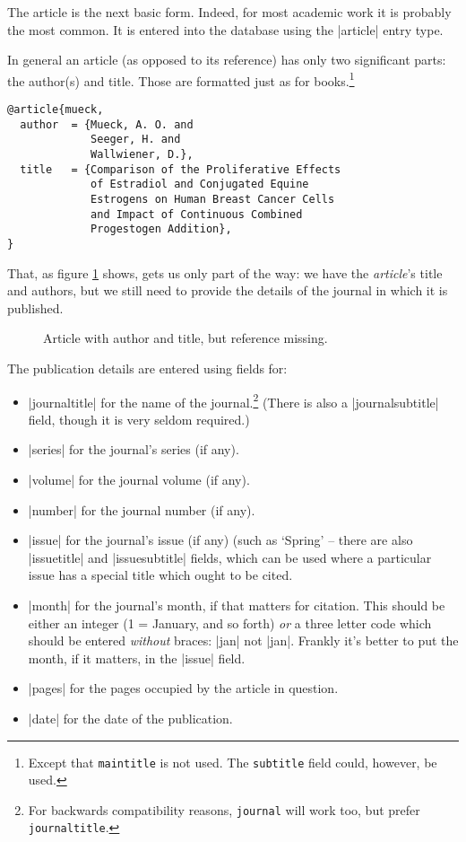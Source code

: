 The article is the next basic form. Indeed, for most academic work it
is probably the most common. It is entered into the database using the
|article| entry type.

In general an article (as opposed to its reference) has only two
significant parts: the author(s) and title. Those are formatted just
as for books.\footnote{Except that \texttt{maintitle} is not used. The
  \texttt{subtitle} field could, however, be used.}
\begin{Verbatim}
@article{mueck,
  author  = {Mueck, A. O. and
             Seeger, H. and
             Wallwiener, D.},
  title   = {Comparison of the Proliferative Effects
             of Estradiol and Conjugated Equine
             Estrogens on Human Breast Cancer Cells
             and Impact of Continuous Combined
             Progestogen Addition},
}
\end{Verbatim}

That, as figure \ref{mueck} shows, gets us only part of the way: we
have the \emph{article}'s title and authors, but we still need to
provide the details of the journal in which it is published.

\begin{figure}
\caption{Article with author and title, but reference missing.\label{mueck}}
\end{figure}

The publication details are entered using fields for:
\begin{itemize}
\item |journaltitle| for the name of the journal.\footnote{For
    backwards compatibility reasons, \texttt{journal} will work too,
    but prefer \texttt{journaltitle}.} (There is also a
  |journalsubtitle| field, though it is very seldom required.)
\item |series| for the journal's series (if any).
\item |volume| for the journal volume (if any).
\item |number| for the journal number (if any).
\item |issue| for the journal's issue (if any) (such as `Spring' --
  there are also |issuetitle| and |issuesubtitle| fields, which can be
  used where a particular issue has a special title which ought to be
  cited.
\item |month| for the journal's month, if that matters for
  citation. This should be either an integer (1 = January, and so
  forth) \emph{or} a three letter code which should be entered
  \emph{without} braces: |jan| not |{jan}|. Frankly it's better to put
  the month, if it matters, in the |issue| field.
\item |pages| for the pages occupied by the article in question.
\item |date| for the date of the publication.
\end{itemize}

